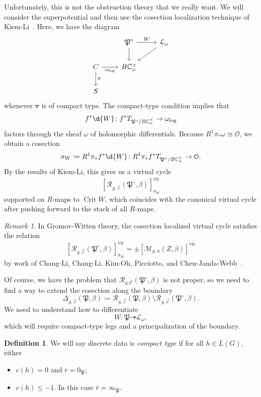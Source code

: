 \documentclass[10pt]{amsart}
\theoremstyle{definition}
\newtheorem{defn}[thm]{Definition}
\theoremstyle{remark}
\newtheorem{rmk}[thm]{Remark}
\theoremstyle{plain}
\theoremstyle{definition}
\theoremstyle{remark}
\newcommand{\C}{\mathbb{C}}
\newcommand{\Mbar}{\overline{\mathcal{M}}}
\newcommand{\mc}[1]{\mathcal{#1}}
\newcommand{\mf}[1]{\mathfrak{#1}}
\newcommand{\btau}{\bm{\tau}}
\newcommand{\mr}[1]{\mathrm{#1}}
\newcommand{\1}{\mathbf{1}}
\newcommand{\2}{\mathbf{2}}
\newcommand{\3}{\mathbf{3}}
\newcommand{\vir}{\mr{vir}}
\DeclareMathOperator{\Crit}{Crit}
\begin{document}
Unfortunately, this is not the obstruction theory that we really want. We will consider the superpotential and then use the cosection localization technique of Kiem-Li~\cite{cosection}. Here, we have the diagram
\begin{equation*}
\begin{tikzcd}
    & \mf{P}^{\circ} \ar{r}{W} \ar{d} & \mc{L}_{\omega} \ar{dl} \\
    C \ar[swap]{r}{\omega_{\log}} \ar{d}{\pi} & B \C_{\omega}^{\times} \\
    S
\end{tikzcd}
\end{equation*}
whenever $\btau$ is of compact type. The compact-type condition implies that
\[ f^* \d{W} \colon f^* T_{\mf{P}^{\circ}/B\C_{\omega}^{\times}} \to \omega_{\log} \]
factors through the sheaf $\omega$ of holomorphic differentials. Because $R^1 \pi_* \omega \cong \mc{O}$, we obtain a cosection
\[ \sigma_W \coloneqq R^1 \pi_* f^* \d{W} \colon R^1 \pi_* f^* T_{\mf{P}^{\circ}/B \C_{\omega}^{\times}} \to \mc{O}. \]
By the results of Kiem-Li, this gives us a virtual cycle
\[ [\mc{R}_{g, \vec{c}}(\mf{P}^{\circ}, \beta)]^{\vir}_{\sigma_W} \]
supported on $R$-maps to $\Crit W$,
which coincides with the canonical virtual cycle after pushing forward to the stack of all $R$-maps.

\begin{rmk}
    In Gromov-Witten theory, the cosection localized virtual cycle satisfies the relation
    \[ [ \mc{R}_{g, \vec{c}}(\mf{P}^{\circ},\beta) ]^{\vir}_{\sigma_W} = \pm [\Mbar_{g,n}(Z,\beta)]^{\vir} \]
    by work of Chang-Li, Chang-Li, Kim-Oh, Picciotto, and Chen-Janda-Webb~\cite{pfieldschangli,clqmap,localizedchern,rpthesis,cjw}.
\end{rmk}

Of course, we have the problem that $\mc{R}_{g, \mc{C}}(\mf{P}^{\circ}, \beta)$ is not proper, so we need to find a way to extend the cosection along the boundary
\[ \Delta_{g, \vec{c}} (\mf{P}, \beta) \coloneqq \mc{R}_{g, \vec{c}}(\mf{P}, \beta) \setminus \mc{R}_{g,\vec{c}}(\mf{P}^{\circ}, \beta). \]
We need to understand how to differentiate
\[ W \colon \mf{P} \dashrightarrow \mc{L}_{\omega}, \]
which will require compact-type legs and a principalization of the boundary.

\begin{defn}
    We will say discrete data is \textit{compact type} if for all $h \in L(G)$, either
    \begin{itemize}
        \item $c(h) = 0$ and $\bar{r} = 0_{\mf{P}}$;
        \item $c(h) \leq -1$. In this case $\bar{r} = \infty_{\mf{P}}$.
    \end{itemize}
\end{defn}
\end{document}
